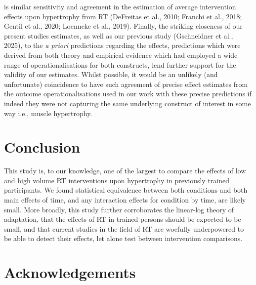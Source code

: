 \documentclass[
]{article}
\begin{document}
is similar sensitivity and agreement in the estimation of average
intervention effects upon hypertrophy from RT (DeFreitas et al., 2010;
Franchi et al., 2018; Gentil et al., 2020; Loenneke et al., 2019).
Finally, the striking closeness of our present studies estimates, as
well as our previous study (Gschneidner et al., 2025), to the \emph{a
priori} predictions regarding the effects, predictions which were
derived from both theory and empirical evidence which had employed a
wide range of operationalisations for both constructs, lend further
support for the validity of our estimates. Whilst possible, it would be
an unlikely (and unfortunate) coincidence to have such agreement of
precise effect estimates from the outcome operationalisations used in
our work with these precise predictions if indeed they were not
capturing the same underlying construct of interest in some way i.e.,
muscle hypertrophy.

\section{Conclusion}\label{conclusion}

This study is, to our knowledge, one of the largest to compare the
effects of low and high volume RT interventions upon hypertrophy in
previously trained participants. We found statistical equivalence
between both conditions and both main effects of time, and any
interaction effects for condition by time, are likely small. More
broadly, this study further corroborates the linear-log theory of
adaptation, that the effects of RT in trained persons should be expected
to be small, and that current studies in the field of RT are woefully
underpowered to be able to detect their effects, let alone test between
intervention comparisons.

\section{Acknowledgements}\label{acknowledgements}
\end{document}
